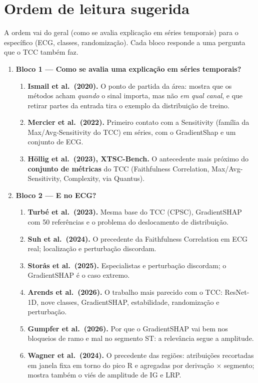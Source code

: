 \documentclass[11pt,a4paper]{article}
\begin{document}
\section{Ordem de leitura sugerida}\label{sec:ordem}
A ordem vai do geral (como se avalia explicação em séries temporais) para o específico (ECG, classes, randomização). Cada bloco responde a uma pergunta que o TCC também faz.

\begin{enumerate}
\item \textbf{Bloco 1 — Como se avalia uma explicação em séries temporais?}
\begin{enumerate}
\item \textbf{Ismail et al.\ (2020).} O ponto de partida da área: mostra que os métodos acham \textit{quando} o sinal importa, mas não \textit{em qual canal}, e que retirar partes da entrada tira o exemplo da distribuição de treino.
\item \textbf{Mercier et al.\ (2022).} Primeiro contato com a Sensitivity (família da Max/Avg-Sensitivity do TCC) em séries, com o GradientShap e um conjunto de ECG.
\item \textbf{Höllig et al.\ (2023), XTSC-Bench.} O antecedente mais próximo do \textbf{conjunto de métricas} do TCC (Faithfulness Correlation, Max/Avg-Sensitivity, Complexity, via Quantus).
\end{enumerate}
\item \textbf{Bloco 2 — E no ECG?}
\begin{enumerate}
\item \textbf{Turbé et al.\ (2023).} Mesma base do TCC (CPSC), GradientSHAP com 50 referências e o problema do deslocamento de distribuição.
\item \textbf{Suh et al.\ (2024).} O precedente da Faithfulness Correlation em ECG real; localização e perturbação discordam.
\item \textbf{Storås et al.\ (2025).} Especialistas e perturbação discordam; o GradientSHAP é o caso extremo.
\item \textbf{Arends et al.\ (2026).} O trabalho mais parecido com o TCC: ResNet-1D, nove classes, GradientSHAP, estabilidade, randomização e perturbação.
\item \textbf{Gumpfer et al.\ (2026).} Por que o GradientSHAP vai bem nos bloqueios de ramo e mal no segmento ST: a relevância segue a amplitude.
\item \textbf{Wagner et al.\ (2024).} O precedente das regiões: atribuições recortadas em janela fixa em torno do pico R e agregadas por derivação × segmento; mostra também o viés de amplitude de IG e LRP.

\end{enumerate}
\end{enumerate}
\end{document}
